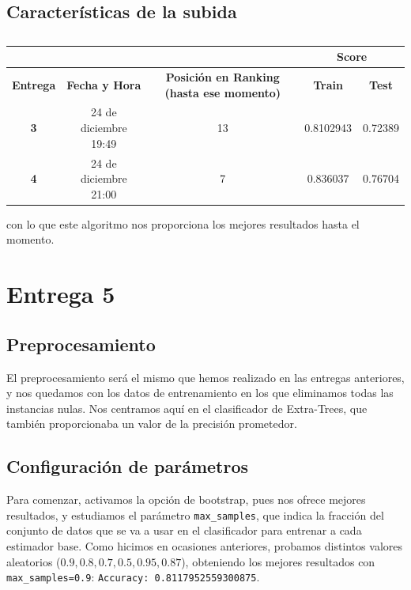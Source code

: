 \documentclass[a4paper,11pt]{article}
\begin{document}
 \subsection{Características de la subida}
 \begin{table}[htbp]
 	\caption{}\begin{center}
 	\begin{tabular}{|c|c|c|c|c|}
 		\hline
 		\multicolumn{1}{|l|}{} & \textbf{} & \textbf{} & \multicolumn{ 2}{c|}{\textbf{Score}} \\ \hline
 		\textbf{Entrega} & \textbf{Fecha y Hora} & \textbf{Posición en Ranking (hasta ese momento)} & \textbf{Train} & \textbf{Test} \\ \hline
 		\textbf{3} & 24  de diciembre 19:49 & 13 & 0.8102943 & 0.72389 \\ \hline
 		\textbf{4} & 24 de diciembre 21:00  & 7 & 0.836037 & 0.76704 \\ \hline
 	\end{tabular}
 	\label{}\end{center}
 \end{table}
 
 con lo que este algoritmo nos proporciona los mejores resultados hasta el momento. 
 
 \section{Entrega 5}
 \subsection{Preprocesamiento}
 El preprocesamiento será el mismo que hemos realizado en las entregas anteriores, y nos quedamos con los datos de entrenamiento en los que eliminamos todas las instancias nulas. Nos centramos aquí en el clasificador de Extra-Trees, que también proporcionaba un valor de la precisión prometedor. 
 \subsection{Configuración de parámetros}
 
 Para comenzar, activamos la opción de bootstrap, pues nos ofrece mejores resultados, y estudiamos el parámetro \texttt{max_samples}, que indica la fracción del conjunto de datos que se va a usar en el clasificador para entrenar a cada estimador base. Como hicimos en ocasiones anteriores, probamos distintos valores aleatorios ($0.9,0.8,0.7,0.5,0.95,0.87$), obteniendo los mejores resultados con \texttt{max_samples=0.9}: \texttt{Accuracy:  0.8117952559300875}.
 
\end{document}
